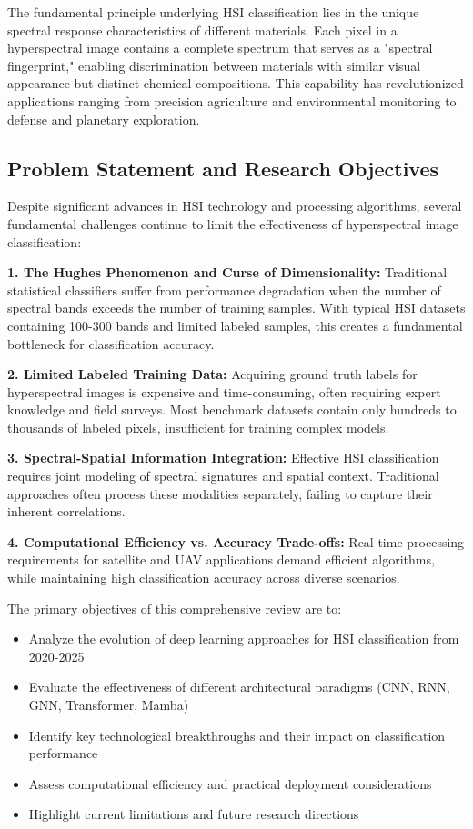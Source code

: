 \documentclass[journal]{IEEEtran}
\begin{document}
The fundamental principle underlying HSI classification lies in the unique spectral response characteristics of different materials. Each pixel in a hyperspectral image contains a complete spectrum that serves as a "spectral fingerprint," enabling discrimination between materials with similar visual appearance but distinct chemical compositions. This capability has revolutionized applications ranging from precision agriculture and environmental monitoring to defense and planetary exploration.

\subsection{Problem Statement and Research Objectives}

Despite significant advances in HSI technology and processing algorithms, several fundamental challenges continue to limit the effectiveness of hyperspectral image classification:

\textbf{1. The Hughes Phenomenon and Curse of Dimensionality:} Traditional statistical classifiers suffer from performance degradation when the number of spectral bands exceeds the number of training samples. With typical HSI datasets containing 100-300 bands and limited labeled samples, this creates a fundamental bottleneck for classification accuracy.

\textbf{2. Limited Labeled Training Data:} Acquiring ground truth labels for hyperspectral images is expensive and time-consuming, often requiring expert knowledge and field surveys. Most benchmark datasets contain only hundreds to thousands of labeled pixels, insufficient for training complex models.

\textbf{3. Spectral-Spatial Information Integration:} Effective HSI classification requires joint modeling of spectral signatures and spatial context. Traditional approaches often process these modalities separately, failing to capture their inherent correlations.

\textbf{4. Computational Efficiency vs. Accuracy Trade-offs:} Real-time processing requirements for satellite and UAV applications demand efficient algorithms, while maintaining high classification accuracy across diverse scenarios.

The primary objectives of this comprehensive review are to:
\begin{itemize}
\item Analyze the evolution of deep learning approaches for HSI classification from 2020-2025
\item Evaluate the effectiveness of different architectural paradigms (CNN, RNN, GNN, Transformer, Mamba)
\item Identify key technological breakthroughs and their impact on classification performance
\item Assess computational efficiency and practical deployment considerations
\item Highlight current limitations and future research directions
\end{itemize}
\end{document}
